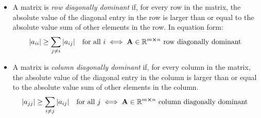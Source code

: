 \documentclass[11pt, a4paper]{article}
\newcommand{\R}{\mathbb{R}} %
\newcommand{\mat}[1]{\mathbf{#1}} %
\begin{document}
\begin{itemize}
\begin{itemize}
		\item A matrix is \textit{row diagonally dominant} if, for every row in the matrix, the absolute value of the diagonal entry in the row is larger than or equal to the absolute value sum of other elements in the row. In equation form:
		\begin{equation*}
			\abs{a_{ii}} \geq \sum_{j \neq i} \abs{a_{ij}} \quad \text{for all } i \iff 	\mat{A} \in \R^{m \cross n} \text{ row diagonally dominant } 
		\end{equation*}
				
		\item A matrix is \textit{column diagonally dominant} if, for every column in the matrix, the absolute value of the diagonal entry in the column is larger than or equal to the absolute value sum of other elements in the column. 
		\begin{equation*}
	 		\abs{a_{jj}} \geq \sum_{i \neq j} \abs{a_{ij}} \quad \text{for all } j \iff 	\mat{A} \in \R^{m\cross n} \text{ column diagonally dominant } 
		\end{equation*}

	\end{itemize}

	
	
\end{itemize}
\end{document}

